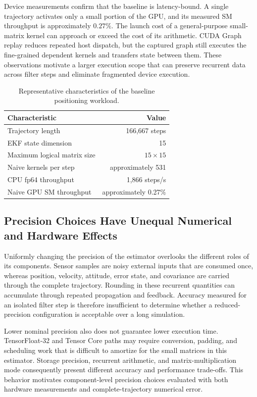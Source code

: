 \documentclass[research]{fcs}
\begin{document}
Device measurements confirm that the baseline is latency-bound. A single trajectory activates only a small portion of the GPU, and its measured SM throughput is approximately $0.27\%$. The launch cost of a general-purpose small-matrix kernel can approach or exceed the cost of its arithmetic. CUDA Graph replay reduces repeated host dispatch, but the captured graph still executes the fine-grained dependent kernels and transfers state between them. These observations motivate a larger execution scope that can preserve recurrent data across filter steps and eliminate fragmented device execution.

\begin{table}[H]
  \centering
  \caption{Representative characteristics of the baseline positioning workload.}
  \label{tab:baseline-characteristics}
  \begin{tabular}{@{}lr@{}}
    \toprule
    Characteristic & Value \\
    \midrule
    Trajectory length & 166,667 steps \\
    EKF state dimension & 15 \\
    Maximum logical matrix size & $15\times15$ \\
    Naive kernels per step & approximately 531 \\
    CPU fp64 throughput & 1,866 steps/s \\
    Naive GPU SM throughput & approximately 0.27\% \\
    \bottomrule
  \end{tabular}
\end{table}

\subsection{Precision Choices Have Unequal Numerical and Hardware Effects}
\label{subsec:motivation-precision}

Uniformly changing the precision of the estimator overlooks the different roles of its components. Sensor samples are noisy external inputs that are consumed once, whereas position, velocity, attitude, error state, and covariance are carried through the complete trajectory. Rounding in these recurrent quantities can accumulate through repeated propagation and feedback. Accuracy measured for an isolated filter step is therefore insufficient to determine whether a reduced-precision configuration is acceptable over a long simulation.

Lower nominal precision also does not guarantee lower execution time. TensorFloat-32 and Tensor Core paths may require conversion, padding, and scheduling work that is difficult to amortize for the small matrices in this estimator. Storage precision, recurrent arithmetic, and matrix-multiplication mode consequently present different accuracy and performance trade-offs. This behavior motivates component-level precision choices evaluated with both hardware measurements and complete-trajectory numerical error.
\end{document}
